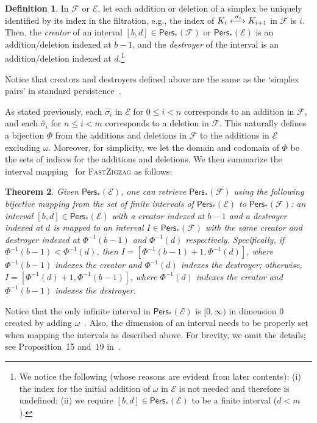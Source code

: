 \documentclass[letterpaper,11pt]{article}
\theoremstyle{mythmstyle}
\newtheorem{theorem}{Theorem}
\theoremstyle{mydefstyle}
\newtheorem{definition}{Definition}
\theoremstyle{plain}
\newtheorem{theorem}{Theorem}
\theoremstyle{definition}
\newtheorem{definition}[theorem]{Definition}
\newcommand{\Pers}{\mathsf{Pers}}
\newcommand{\<}[1]{\langle #1\rangle}
\newcommand{\inv}{^{-1}}
\newcommand{\lbarrowspace}{\;}
\newcommand{\lrarrowsp}[1]{\xleftrightarrow{\lbarrowspace#1\lbarrowspace}}
\let\leftrightarrowsp\lrarrowsp
\newcommand{\Ecal}{\mathcal{E}}
\newcommand{\Fcal}{\mathcal{F}}
\newcommand{\oG}{\omega}
\newcommand{\filtcnt}{m}
\newcommand{\simpcnt}{n}
\newcommand{\fsimp}[2]{\sigma_{#2}}
\newcommand{\ef}{\Ecal}
\newcommand{\hatfsimp}{\hat{\sigma}}
\newcommand{\defemph}[1]{{\textit{#1}}}
\begin{document}
\begin{definition}
In $\Fcal$ or $\ef$, 
let each addition or deletion of a simplex
be uniquely identified by its index in the filtration,
e.g., the index of $K_i\leftrightarrowsp{\fsimp{}{i}}K_{i+1}$ in $\Fcal$ is $i$.
Then, 
the \defemph{creator} of an interval $[b,d]\in\Pers_*(\Fcal)\text{ or }\Pers_*(\ef)$
is an addition/deletion indexed at $b-1$,
and the \defemph{destroyer} of the interval
is an addition/deletion indexed at $d$.\footnote{We notice the following 
(whose reasons are evident from later contents): 
(i) the index for
the initial addition of $\oG$ in $\ef$ is not needed and therefore is undefined; 
(ii) we require $[b,d]\in\Pers_*(\ef)$ to be a finite interval ($d<\filtcnt$).}
\end{definition}
Notice that  creators and destroyers defined above are the same 
as the `simplex pairs' in standard persistence~\cite{edelsbrunner2000topological}.

As stated previously, 
each $\hatfsimp_i$ in $\ef$ for $0\leq i<\simpcnt$ corresponds
to an addition in $\Fcal$, and
each $\hatfsimp_i$ for $\simpcnt\leq i<\filtcnt$ corresponds
to a deletion in $\Fcal$.
This naturally defines a bijection $\Phi$
from the additions and deletions in $\Fcal$ to the additions in $\ef$ excluding $\oG$.
Moreover, for simplicity, we let the domain and codomain of $\Phi$
be the sets of indices for the additions and deletions.
We then summarize the interval mapping~\cite{dey2022fast} for \textsc{FastZigzag}
as follows:

\begin{theorem}
\label{thm:fzz-intv-map}
Given $\Pers_*(\ef)$, one can retrieve $\Pers_*(\Fcal)$ 
using the following bijective mapping
from the set of finite intervals of $\Pers_*(\ef)$
to $\Pers_*(\Fcal)$:
an 
interval $[b,d]\in\Pers_*(\ef)$ 
with a creator indexed at $b-1$ and a destroyer indexed at $d$
is mapped to an interval $I\in \Pers_*(\Fcal)$ with
the same creator and destroyer indexed at 
$\Phi\inv(b-1)$ and $\Phi\inv(d)$ respectively.
Specifically, if $\Phi\inv(b-1)<\Phi\inv(d)$, then $I=[\Phi\inv(b-1)+1,\Phi\inv(d)]$,
where $\Phi\inv(b-1)$ indexes the creator and $\Phi\inv(d)$ indexes the destroyer;
otherwise,
$I=[\Phi\inv(d)+1,\Phi\inv(b-1)]$,
where $\Phi\inv(d)$ indexes the creator and $\Phi\inv(b-1)$ indexes the destroyer.
\end{theorem}
Notice that the only infinite interval in $\Pers_*(\ef)$ is $[0,\infty)$ in dimension 0 created by adding $\oG$~\cite{cohen2009extending}.
Also, the dimension of an interval needs to be properly set when mapping the intervals as described above.
For brevity, we omit the details; see Proposition~15 and~19 in~\cite{dey2022fast}.
\end{document}
